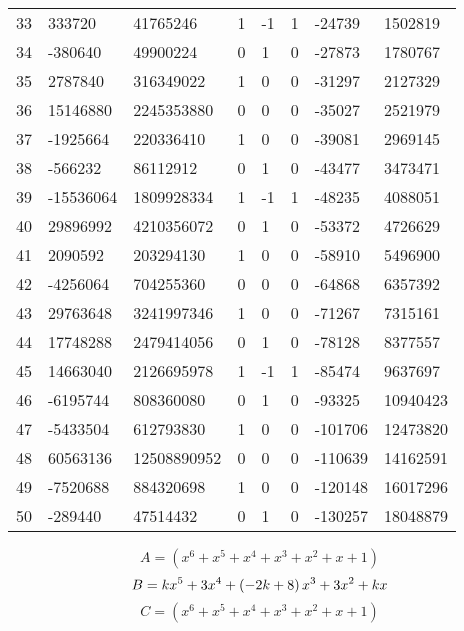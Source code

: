 \documentclass{amsart}
\begin{document}
\begin{longtable}{|l|l|l|lllll|}
33&333720&41765246&1&-1&1&-24739&1502819\\
34&-380640&49900224&0&1&0&-27873&1780767\\
35&2787840&316349022&1&0&0&-31297&2127329\\
36&15146880&2245353880&0&0&0&-35027&2521979\\
37&-1925664&220336410&1&0&0&-39081&2969145\\
38&-566232&86112912&0&1&0&-43477&3473471\\
39&-15536064&1809928334&1&-1&1&-48235&4088051\\
40&29896992&4210356072&0&1&0&-53372&4726629\\
41&2090592&203294130&1&0&0&-58910&5496900\\
42&-4256064&704255360&0&0&0&-64868&6357392\\
43&29763648&3241997346&1&0&0&-71267&7315161\\
44&17748288&2479414056&0&1&0&-78128&8377557\\
45&14663040&2126695978&1&-1&1&-85474&9637697\\
46&-6195744&808360080&0&1&0&-93325&10940423\\
47&-5433504&612793830&1&0&0&-101706&12473820\\
48&60563136&12508890952&0&0&0&-110639&14162591\\
49&-7520688&884320698&1&0&0&-120148&16017296\\
50&-289440&47514432&0&1&0&-130257&18048879\\
\hline
\end{longtable}
$$A=(x^6
 + x^5
 + x^4
 + x^3
 + x^2
 + x
 + 1)$$
$$B=k\*x^5
 + 3\*x^4
 + \left(-2\*k
 + 8\right) \*x^3
 + 3\*x^2
 + k\*x$$
$$C=(x^6
 + x^5
 + x^4
 + x^3
 + x^2
 + x
 + 1)$$
\end{document}
